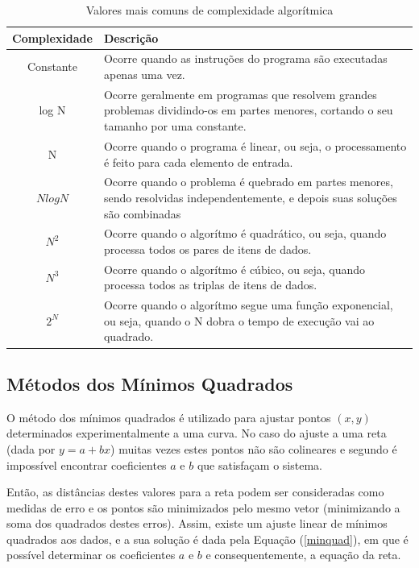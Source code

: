 {\begin{table}[h]
	\centering	
	\begin{tabularx}{0.9\textwidth}{cX}
		\toprule
		\textbf{Complexidade} & \textbf{Descrição}  \\
		\midrule
		Constante &  Ocorre quando as instruções do programa são executadas apenas uma vez.\\
		log N & Ocorre geralmente em programas que resolvem grandes problemas dividindo-os em partes menores, cortando o seu tamanho por uma constante.  \\
		N & Ocorre quando o programa é linear, ou seja, o  processamento é feito para cada elemento de entrada. \\
		$ N log N$ & Ocorre quando o problema é quebrado em partes menores, sendo resolvidas independentemente, e depois suas soluções são combinadas \\
		$ N^{2}$ & Ocorre quando o algorítmo é quadrático, ou seja, quando processa todos os pares de itens de dados. \\
		$ N^{3}$ & Ocorre quando o algorítmo é cúbico, ou seja, quando processa todos as triplas de itens de dados. \\
		$ 2^{N}$ & Ocorre quando o algorítmo segue uma função exponencial, ou seja, quando o N dobra o tempo de execução vai ao quadrado. \\
	
		\bottomrule
	\end{tabularx}
	\caption{ Valores mais comuns de complexidade algorítmica}
	\label{complexidadeAlgoritmica}
\end{table}


	\subsection{Métodos dos Mínimos Quadrados}
	\label{metminqua}

	O método dos mínimos quadrados é utilizado para ajustar pontos $(x,y)$ determinados experimentalmente a uma curva. No caso do ajuste a uma reta (dada por $y = a + bx$) muitas vezes estes pontos não são colineares e segundo \cite{minq} é impossível encontrar coeficientes $a$ e $b$ que satisfaçam o sistema.

	 Então, as distâncias destes valores para a reta podem ser consideradas como medidas de erro e os pontos são minimizados pelo mesmo vetor (minimizando a soma dos quadrados destes erros).  Assim, existe um ajuste linear de mínimos quadrados aos dados, e a sua solução é dada pela Equação (\ref{minquad}), em que é possível determinar os coeficientes $a$ e $b$ e consequentemente, a equação da reta. 

}

